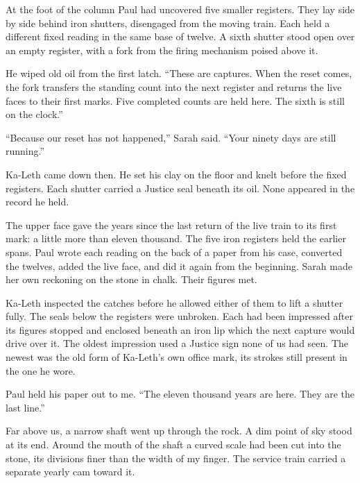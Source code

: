 At the foot of the column Paul had uncovered five smaller registers. They lay side by side behind iron shutters, disengaged from the moving train. Each held a different fixed reading in the same base of twelve. A sixth shutter stood open over an empty register, with a fork from the firing mechanism poised above it.\par

He wiped old oil from the first latch. ``These are captures. When the reset comes, the fork transfers the standing count into the next register and returns the live faces to their first marks. Five completed counts are held here. The sixth is still on the clock.''\par

``Because our reset has not happened,'' Sarah said. ``Your ninety days are still running.''\par

Ka-Leth came down then. He set his clay on the floor and knelt before the fixed registers. Each shutter carried a Justice seal beneath its oil. None appeared in the record he held.\par

The upper face gave the years since the last return of the live train to its first mark: a little more than eleven thousand. The five iron registers held the earlier spans. Paul wrote each reading on the back of a paper from his case, converted the twelves, added the live face, and did it again from the beginning. Sarah made her own reckoning on the stone in chalk. Their figures met.\par

Ka-Leth inspected the catches before he allowed either of them to lift a shutter fully. The seals below the registers were unbroken. Each had been impressed after its figures stopped and enclosed beneath an iron lip which the next capture would drive over it. The oldest impression used a Justice sign none of us had seen. The newest was the old form of Ka-Leth's own office mark, its strokes still present in the one he wore.\par

Paul held his paper out to me. ``The eleven thousand years are here. They are the last line.''\par

Far above us, a narrow shaft went up through the rock. A dim point of sky stood at its end. Around the mouth of the shaft a curved scale had been cut into the stone, its divisions finer than the width of my finger. The service train carried a separate yearly cam toward it.\par

